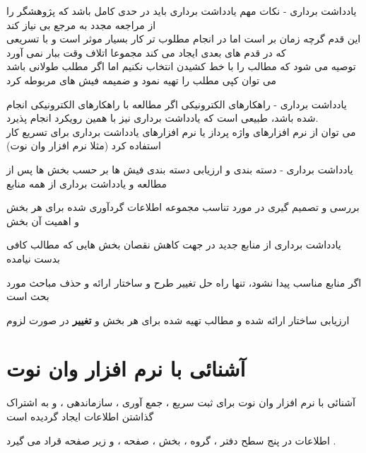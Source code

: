 \documentclass[14pt]{beamer}
\newcommand{\framefontsizelarge}{\fontsize{18pt}{0pt}\selectfont}
\newcommand{\frametitlefontsize}{\fontsize{20pt}{0pt}\selectfont}
\newcommand{\defaultvspace}{\vspace{5mm}}
\begin{document}
\begin{persian}
	\begin{frame}{\frametitlefontsize یادداشت برداری - نکات مهم}
		\framefontsizelarge
		یادداشت برداری باید در حدی کامل باشد که پژوهشگر را از مراجعه مجدد به مرجع بی نیاز کند\\
		این قدم گرچه زمان بر است اما در انجام مطلوب تر کار بسیار موثر است و با تسریعی که در قدم های بعدی ایجاد می کند مجموعا اتلاف وقت ببار نمی آورد\defaultvspace\\
		توصیه می شود که مطالب را با خط کشیدن انتخاب نکنیم اما اگر مطلب طولانی باشد می توان کپی مطلب را تهیه نمود و ضمیمه فیش های مربوطه کرد
	\end{frame}
	
	\begin{frame}{\frametitlefontsize یادداشت برداری - راهکارهای الکترونیکی}
		\framefontsizelarge
		اگر مطالعه با راهکارهای الکترونیکی انجام شده باشد، طبیعی است که یادداشت برداری نیز با همین رویکرد انجام پذیرد. \defaultvspace\\
		می توان از نرم افزارهای واژه پرداز یا نرم افزارهای یادداشت برداری برای تسریع کار استفاده کرد (مثلا نرم افزار وان نوت)
	\end{frame}
	
	\begin{frame}{\frametitlefontsize  یادداشت برداری - دسته بندی و ارزیابی }
		\framefontsizelarge
		دسته بندی فیش ها بر حسب بخش ها پس از مطالعه و یادداشت برداری از همه منابع
		
		بررسی و تصمیم گیری در مورد تناسب مجموعه اطلاعات گردآوری شده برای هر بخش و اهمیت آن بخش

		یادداشت برداری از منابع جدید در جهت کاهش نقصان بخش هایی که مطالب کافی بدست نیامده
		
		اگر منابع مناسب پیدا نشود، تنها راه حل تغییر طرح و ساختار ارائه و حذف مباحث مورد بحث است
		
		ارزیابی ساختار ارائه شده و مطالب تهیه شده برای هر بخش و \textbf{تغییر} در صورت لزوم
	\end{frame}
	
	\section{آشنائی با نرم افزار وان نوت}
	
	\begin{frame}{\frametitlefontsize  آشنائی با نرم افزار وان نوت }
		\framefontsizelarge
		برای ثبت سریع ، جمع آوری ، سازماندهی ، و به اشتراک گذاشتن اطلاعات ایجاد گردیده است 
		
		اطلاعات در پنج سطح دفتر ، گروه ، بخش ، صفحه ، و زیر صفحه قراد می گیرد .
		

\end{frame}
\end{persian}
\end{document}
